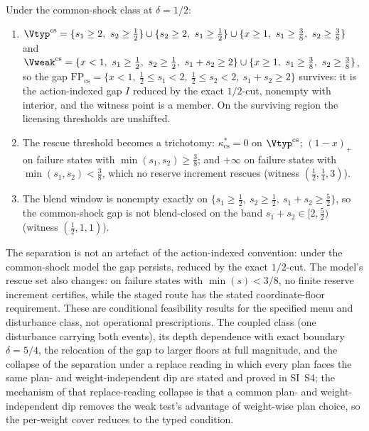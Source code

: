 \begin{proposition}\label{prop:commonshock}
Under the common-shock class at $\delta=1/2$:
\begin{enumerate}[label=\textup{(\roman*)},leftmargin=2em]
\item $\Vtyp^{\mathrm{cs}}=\{s_1\ge2,\ s_2\ge\tfrac12\}\cup\{s_2\ge2,\ s_1\ge\tfrac12\}\cup\{x\ge1,\ s_1\ge\tfrac38,\ s_2\ge\tfrac38\}$ and
$\Vweak^{\mathrm{cs}}=\{x<1,\ s_1\ge\tfrac12,\ s_2\ge\tfrac12,\ s_1+s_2\ge2\}\cup\{x\ge1,\ s_1\ge\tfrac38,\ s_2\ge\tfrac38\}$, so the gap
$\mathrm{FP}_{\mathrm{cs}}=\{x<1,\ \tfrac12\le s_1<2,\ \tfrac12\le s_2<2,\ s_1+s_2\ge2\}$
survives: it is the action-indexed gap $I$ reduced by the exact $1/2$-cut, nonempty with interior, and the witness point is a member. On the surviving region the licensing thresholds are unshifted.
\item The rescue threshold becomes a trichotomy: $\kappa^*_{\mathrm{cs}}=0$ on $\Vtyp^{\mathrm{cs}}$; $(1-x)_+$ on failure states with $\min(s_1,s_2)\ge\tfrac38$; and $+\infty$ on failure states with $\min(s_1,s_2)<\tfrac38$, which no reserve increment rescues (witness $(\tfrac12,\tfrac14,3)$).
\item The blend window is nonempty exactly on $\{s_1\ge\tfrac12,\ s_2\ge\tfrac12,\ s_1+s_2\ge\tfrac52\}$, so the common-shock gap is not blend-closed on the band $s_1+s_2\in[2,\tfrac52)$ (witness $(\tfrac12,1,1)$).
\end{enumerate}
\end{proposition}

The separation is not an artefact of the action-indexed convention: under the common-shock model the gap persists, reduced by the exact $1/2$-cut. The model's rescue set also changes: on failure states with $\min(s)<3/8$, no finite reserve increment certifies, while the staged route has the stated coordinate-floor requirement. These are conditional feasibility results for the specified menu and disturbance class, not operational prescriptions. The coupled class (one disturbance carrying both events), its depth dependence with exact boundary $\delta=5/4$, the relocation of the gap to larger floors at full magnitude, and the collapse of the separation under a replace reading in which every plan faces the same plan- and weight-independent dip are stated and proved in SI~S4; the mechanism of that replace-reading collapse is that a common plan- and weight-independent dip removes the weak test's advantage of weight-wise plan choice, so the per-weight cover reduces to the typed condition.

